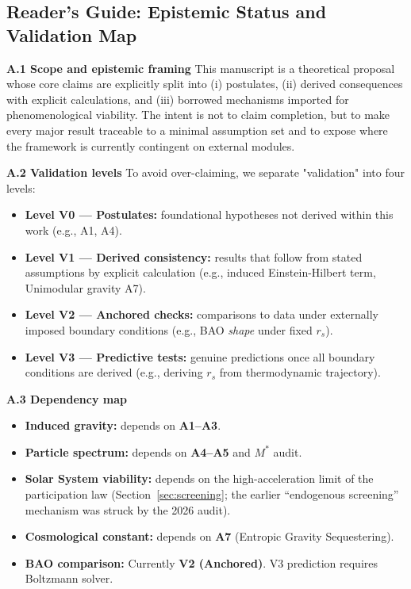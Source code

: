 \documentclass[a4paper,12pt]{article}
\begin{document}
\subsection{Reader's Guide: Epistemic Status and Validation Map}

\textbf{A.1 Scope and epistemic framing}
This manuscript is a theoretical proposal whose core claims are explicitly split into (i) postulates, (ii) derived consequences with explicit calculations, and (iii) borrowed mechanisms imported for phenomenological viability. The intent is not to claim completion, but to make every major result traceable to a minimal assumption set and to expose where the framework is currently contingent on external modules.

\textbf{A.2 Validation levels}
To avoid over-claiming, we separate "validation" into four levels:
\begin{itemize}
    \item \textbf{Level V0 — Postulates:} foundational hypotheses not derived within this work (e.g., A1, A4).
    \item \textbf{Level V1 — Derived consistency:} results that follow from stated assumptions by explicit calculation (e.g., induced Einstein-Hilbert term, Unimodular gravity A7).
    \item \textbf{Level V2 — Anchored checks:} comparisons to data under externally imposed boundary conditions (e.g., BAO \emph{shape} under fixed $r_s$).
    \item \textbf{Level V3 — Predictive tests:} genuine predictions once all boundary conditions are derived (e.g., deriving $r_s$ from thermodynamic trajectory).
\end{itemize}

\textbf{A.3 Dependency map}
\begin{itemize}
    \item \textbf{Induced gravity:} depends on \textbf{A1--A3}.
    \item \textbf{Particle spectrum:} depends on \textbf{A4--A5} and $M^*$ audit.
    \item \textbf{Solar System viability:} depends on the high-acceleration limit of the participation law (Section~\ref{sec:screening}; the earlier ``endogenous screening'' mechanism was struck by the 2026 audit).
    \item \textbf{Cosmological constant:} depends on \textbf{A7} (Entropic Gravity Sequestering).
    \item \textbf{BAO comparison:} Currently \textbf{V2 (Anchored)}. V3 prediction requires Boltzmann solver.
\end{itemize}
\end{document}
